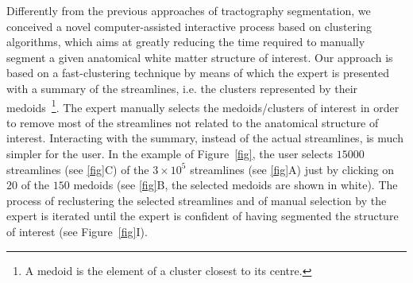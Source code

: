Differently from the previous approaches of tractography segmentation,
we conceived a novel computer-assisted interactive process based on
clustering algorithms, which aims at greatly reducing the time
required to manually segment a given anatomical white matter structure
of interest. 
Our approach is based on a fast-clustering technique by means of which
the expert is presented with a summary of the streamlines, i.e. the
clusters represented by their medoids~\footnote{A medoid is the
  element of a cluster closest to its centre.}. The expert manually
selects the medoids/clusters of interest in order to remove most of
the streamlines not related to the anatomical structure of interest.
Interacting with the summary, instead of the actual streamlines, is
much simpler for the user. In the example of Figure~\ref{fig}, the
user selects $15000$ streamlines (see \ref{fig}C) of the $3 \times
10^5$ streamlines (see \ref{fig}A) just by clicking on $20$ of the
$150$ medoids (see \ref{fig}B, the selected medoids are shown in
white).  The process of reclustering the selected streamlines and of
manual selection by the expert is iterated until the expert is
confident of having segmented the structure of interest (see
Figure~\ref{fig}I).

